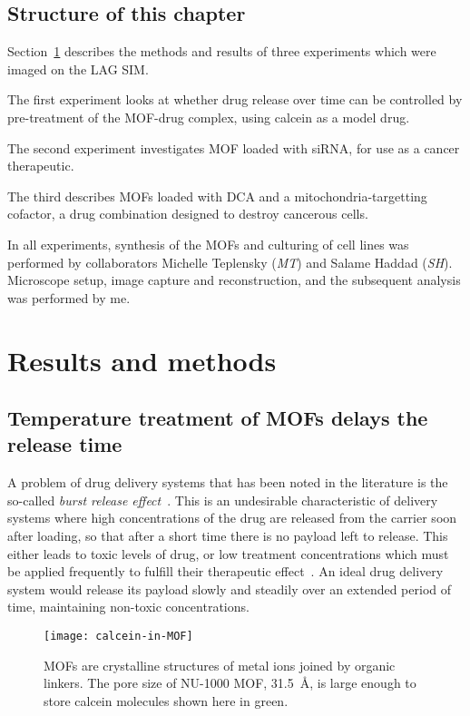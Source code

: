\subsection{Structure of this chapter}
Section~\ref{sec:mofmethods} describes the methods and results of three experiments which were imaged on the LAG SIM.

The first experiment looks at whether drug release over time can be controlled by pre-treatment of the MOF-drug complex, using calcein as a model drug.

The second experiment investigates MOF loaded with siRNA, for use as a cancer therapeutic.

The third describes MOFs loaded with DCA and a mitochondria-targetting cofactor, a drug combination designed to destroy cancerous cells.

In all experiments, synthesis of the MOFs and culturing of cell lines was performed by collaborators Michelle Teplensky (\textit{MT}) and Salame Haddad (\textit{SH}).
Microscope setup, image capture and reconstruction, and the subsequent analysis was performed by me.

\section{Results and methods} \label{sec:mofmethods}

\subsection{Temperature treatment of MOFs delays the release time} \label{sec:mof-temperature}
A problem of drug delivery systems that has been noted in the literature is the so-called \textit{burst release effect}~\cite{huang2001importance}.
This is an undesirable characteristic of delivery systems where high concentrations of the drug are released from the carrier soon after loading, so that after a short time there is no payload left to release.
This either leads to toxic levels of drug, or low treatment concentrations which must be applied frequently to fulfill their therapeutic effect~\cite{fu2010drug}.
An ideal drug delivery system would release its payload slowly and steadily over an extended period of time, maintaining non-toxic concentrations.

\begin{figure}[b!]
\centering
\texttt{[image: calcein-in-MOF]}
\caption[MOFs: The NU-1000 MOF has a large pore size to store other molecules]{MOFs are crystalline structures of metal ions joined by organic linkers. The pore size of NU-1000 MOF, \SI{31.5}{\angstrom}, is large enough to store calcein molecules shown here in green.}
\label{fig:calcein-in-MOF}
\end{figure}

